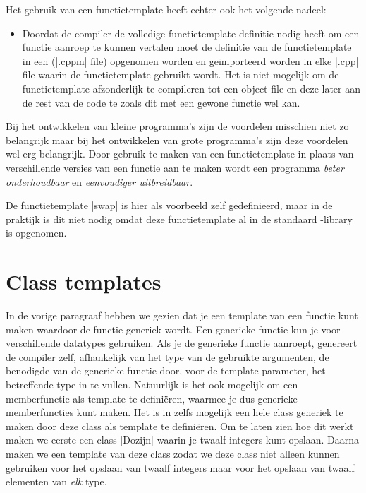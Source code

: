 \begin{cpplstShortInline}
Het gebruik van een functietemplate heeft echter ook het volgende nadeel:
\begin{itemize}
    \item Doordat de compiler de volledige functietemplate definitie nodig heeft om een functie aanroep te kunnen vertalen moet de definitie van de functietemplate in een  (|.cppm| file) opgenomen worden en geïmporteerd worden in elke |.cpp| file waarin de functietemplate gebruikt wordt.
    Het is niet mogelijk om de functietemplate afzonderlijk te compileren tot een object file en deze later aan de rest van de code te  zoals dit met een gewone functie wel kan.
\end{itemize}

Bij het ontwikkelen van kleine programma's zijn de voordelen misschien niet zo belangrijk maar bij het ontwikkelen van grote programma's zijn deze voordelen wel erg belangrijk.
Door gebruik te maken van een functietemplate in plaats van  verschillende versies van een functie aan te maken wordt een programma \emph{beter onderhoudbaar} en \emph{eenvoudiger uitbreidbaar}.

De functietemplate |swap| is hier als voorbeeld zelf gedefinieerd, maar in de praktijk is dit niet nodig omdat deze functietemplate al in de standaard \Cpp{}\hyp{}library is opgenomen.

\section{Class templates}
\label{sec:classtemplate}
In de vorige paragraaf hebben we gezien dat je een template van een functie kunt maken waardoor de functie generiek wordt.
Een generieke functie kun je voor verschillende datatypes gebruiken.
Als je de generieke functie aanroept, genereert de compiler zelf, afhankelijk van het type van de gebruikte argumenten, de benodigde  van de generieke functie door, voor de template\hyp{}parameter, het betreffende type in te vullen.
Natuurlijk is het ook mogelijk om een memberfunctie als template te definiëren, waarmee je dus generieke memberfuncties kunt maken.
Het is in \Cpp{} zelfs mogelijk een hele class generiek te maken door deze class als template te definiëren.
Om te laten zien hoe dit werkt maken we eerste een class |Dozijn| waarin je twaalf integers kunt opslaan.
Daarna maken we een template van deze class zodat we deze class niet alleen kunnen gebruiken voor het opslaan van twaalf integers maar voor het opslaan van twaalf elementen van \emph{elk} type.


\end{cpplstShortInline}
